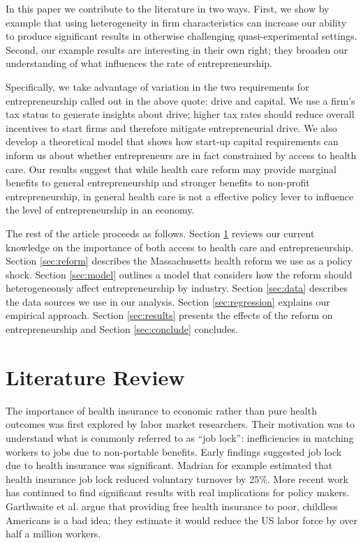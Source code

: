 In this paper we contribute to the literature in two ways. First, we show by example that using heterogeneity in firm characteristics can increase our ability to produce significant results in otherwise challenging quasi-experimental settings. Second, our example results are interesting in their own right; they broaden our understanding of what influences the rate of entrepreneurship. 

Specifically, we take advantage of variation in the two requirements for entrepreneurship called out in the above quote: drive and capital. We use a firm's tax status to generate insights about drive; higher tax rates should reduce overall incentives to start firms and therefore mitigate entrepreneurial drive. We also develop a theoretical model that shows how start-up capital requirements can inform us about whether entrepreneurs are in fact constrained by access to health care. Our results suggest that while health care reform may provide marginal benefits to general entrepreneurship and stronger benefits to non-profit entrepreneurship, in general health care is not a effective policy lever to influence the level of entrepreneurship in an economy.

The rest of the article proceeds as follows. Section \ref{sec:review} reviews our current knowledge on the importance of both access to health care and entrepreneurship. Section \ref{sec:reform} describes the Massachusetts health reform we use as a policy shock. Section \ref{sec:model} outlines a model that considers how the reform should heterogeneously affect entrepreneurship by industry. Section \ref{sec:data} describes the data sources we use in our analysis. Section \ref{sec:regression} explains our empirical approach. Section \ref{sec:results} presents the effects of the reform on entrepreneurship and Section \ref{sec:conclude} concludes. 

\chapter{Literature Review}
\label{sec:review}

The importance of health insurance to economic rather than pure health outcomes was first explored by labor market researchers. Their motivation was to understand what is commonly referred to as ``job lock'': inefficiencies in matching workers to jobs due to non-portable benefits. Early findings suggested job lock due to health insurance was significant. Madrian \cite{madrian} for example estimated that health insurance job lock reduced voluntary turnover by 25\%. More recent work has continued to find significant results with real implications for policy makers. Garthwaite et al. \cite{garthwaite} argue that providing free health insurance to poor, childless Americans is a bad idea; they estimate it would reduce the US labor force by over half a million workers. 

